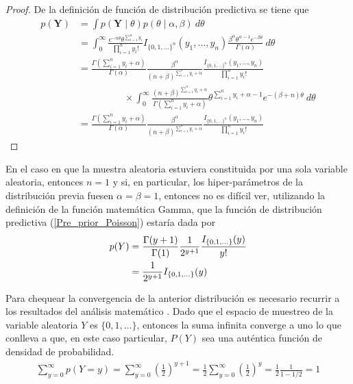     \begin{proof}
    De la definici\'on de funci\'on de distribuci\'on predictiva se tiene que 
    \begin{align*}
    p(\mathbf{Y})&=\int p(\mathbf{Y} \mid \theta)p(\theta \mid \alpha,\beta)\ d\theta\\
    &=\int_0^{\infty} \frac{e^{-n\theta}\theta^{\sum_{i=1}^ny_i}}{\prod_{i=1}^ny_i!}I_{\{0,1,\ldots\}^n}(y_1,\ldots,y_n)
    \frac{\beta^\alpha \theta^{\alpha-1} e^{-\beta\theta}}{\Gamma(\alpha)}\ d\theta\\
    &=\frac{\Gamma(\sum_{i=1}^ny_i+\alpha)}{\Gamma(\alpha)}\frac{\beta^\alpha}{(n+\beta)^{\sum_{i=1}^ny_i+\alpha}}
    \frac{I_{\{0,1,\ldots\}^n}(y_1,\ldots,y_n)}{\prod_{i=1}^ny_i!}\\
    &\hspace{2cm}\times
    \int_0^{\infty} \frac{(n+\beta)^{\sum_{i=1}^ny_i+\alpha}}{\Gamma(\sum_{i=1}^ny_i+\alpha)}
    \theta^{\sum_{i=1}^ny_i+\alpha-1}e^{-(\beta+n)\theta} \ d\theta\\
    &=\frac{\Gamma(\sum_{i=1}^ny_i+\alpha)}{\Gamma(\alpha)}\frac{\beta^\alpha}{(n+\beta)^{\sum_{i=1}^ny_i+\alpha}}
    \frac{I_{\{0,1,\ldots\}^n}(y_1,\ldots,y_n)}{\prod_{i=1}^ny_i!}
    \end{align*}
    \end{proof}
    
    En el caso en que la muestra aleatoria estuviera constituida por una sola variable aleatoria, entonces $n=1$ y si, en particular, los hiper-par\'ametros de la distribuci\'on previa fuesen $\alpha=\beta=1$, entonces no es dif\'icil ver, utilizando la definici\'on de la funci\'on matem\'atica Gamma, que la funci\'on de distribuci\'on predictiva (\ref{Pre_prior_Poisson}) estar\'ia dada por
    \begin{align}\label{Pre_prior_poisson1}
    p(Y)&=\frac{\Gamma(y+1)}{\Gamma(1)}\frac{1}{2^{y+1}}\frac{I_{\{0,1,\ldots\}}(y)}{y!} \notag\\
    &=\frac{1}{2^{y+1}}I_{\{0,1,\ldots\}}(y)
    \end{align}
    
    Para chequear la convergencia de la anterior distribuci\'on es necesario recurrir a los resultados del an\'alisis matem\'atico \cite[p. 361]{Apostol}. Dado que el espacio de muestreo de la variable aleatoria $Y$ es $\{0,1,\ldots\}$, entonces la suma infinita converge a uno lo que conlleva a que, en este caso particular, $P(Y)$ sea una aut\'entica funci\'on de densidad de probabilidad.
    \begin{align*}
    \sum_{y=0}^{\infty}p(Y=y)=\sum_{y=0}^{\infty}\left(\frac{1}{2}\right)^{y+1}=\frac{1}{2}\sum_{y=0}^{\infty}\left(\frac{1}{2}\right)^{y}
    =\frac{1}{2}\frac{1}{1-1/2}=1
    \end{align*}
    
